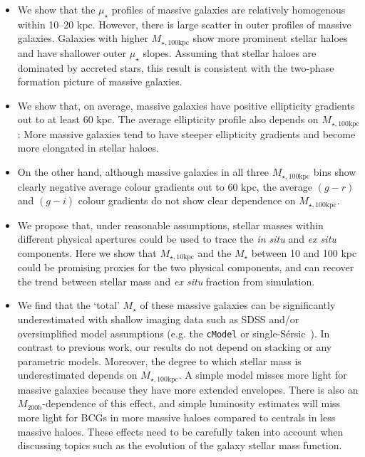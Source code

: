 \documentclass[fleqn,usenatbib]{mnras}
\def\ser{{S\'{e}rsic\ }}
\def\mstar{{$M_{\star}$}}
\def\mhalo{{$M_{\mathrm{200b}}$}}
\def\minn{{$M_{\star,10\mathrm{kpc}}$}}
\def\mtot{{$M_{\star,100\mathrm{kpc}}$}}
\def\mden{{$\mu_{\star}$}}
\begin{document}
    \begin{itemize}  
        
        \item We show that the \mden{} profiles of massive galaxies are relatively
            homogenous within 10--20 kpc. 
            However, there is large scatter in outer profiles of massive galaxies. 
            Galaxies with higher \mtot{} show more prominent stellar haloes and have 
            shallower outer \mden{} slopes. 
            Assuming that stellar haloes are dominated by accreted stars, this result 
            is consistent with the two-phase formation picture of massive galaxies.
             
        \item We show that, on average, massive galaxies have positive ellipticity 
            gradients out to at least 60 kpc. 
            The average ellipticity profile also depends on \mtot{}: More massive 
            galaxies tend to have steeper ellipticity gradients and become more 
            elongated in stellar haloes. 
        
        \item On the other hand, although massive galaxies in all three \mtot{} bins 
            show clearly negative average colour gradients out to 60 kpc, the 
            average $(g-r)$ and $(g-i)$ colour gradients do not show clear 
            dependence on \mtot{}. 
            
        \item We propose that, under reasonable assumptions, stellar masses within 
            different physical apertures could be used to trace the 
            \textit{in situ} and \textit{ex situ} components. 
            Here we show that \minn{} and the \mstar{} between 10 and 100 kpc could 
            be promising proxies for the two physical components, and can recover the 
            trend between stellar mass and \textit{ex situ} fraction from simulation.
         
        \item We find that the `total' \mstar{} of these massive galaxies can be 
            significantly underestimated with shallow imaging data such as SDSS and/or 
            oversimplified model assumptions (e.g. the \texttt{cModel} or single-\ser). 
            In contrast to previous work, our results do not depend on stacking or any 
            parametric models. 
            Moreover, the degree to which stellar mass is underestimated depends on 
            \mtot{}. 
            A simple model misses more light for massive galaxies because they have 
            more extended envelopes. 
            There is also an \mhalo{}-dependence of this effect, and simple 
            luminosity estimates will miss more light for BCGs in more massive 
            haloes compared to centrals in less massive haloes.
            These effects need to be carefully taken into account when discussing 
            topics such as the evolution of the galaxy stellar mass function.  
                        
    \end{itemize}
\end{document}
